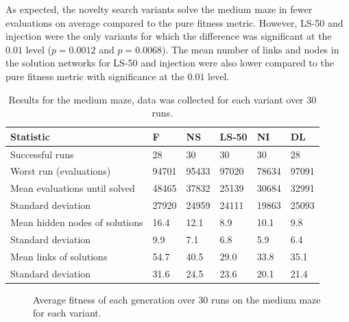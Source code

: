 As expected, the novelty search variants solve the medium maze in fewer evaluations on average
compared to the pure fitness metric. However, LS-50 and injection were the only variants for which
the difference was significant at the $0.01$ level ($p=0.0012$ and $p=0.0068$). The mean number of
links and nodes in the solution networks for LS-50 and injection were also lower
compared to the pure fitness metric with significance at the $0.01$ level.

\begin{table}[H]
    \centering
    \begin{tabular}{llllll}
    \toprule
    Statistic & \multicolumn{1}{l}{F} & \multicolumn{1}{l}{NS} & \multicolumn{1}{l}{LS-50} & \multicolumn{1}{l}{NI} & \multicolumn{1}{l}{DL} \\
    \midrule
    Successful runs & 28 & 30 & 30 & 30 & 28 \\
    Worst run (evaluations) & 94701 & 95433 & 97020 & 78634 & 97091 \\
    \rowcolor[gray]{.9} Mean evaluations until solved & 48465 & 37832 & 25139 & 30684 & 32991 \\
    Standard deviation & 27920  & 24959 & 24111 & 19863 & 25093 \\
    \rowcolor[gray]{.9} Mean hidden nodes of solutions & 16.4 & 12.1  & 8.9  & 10.1 & 9.8 \\
    Standard deviation & 9.9 & 7.1 & 6.8 & 5.9 & 6.4 \\
    \rowcolor[gray]{.9} Mean links of solutions & 54.7  & 40.5 & 29.0 & 33.8 & 35.1 \\
    Standard deviation & 31.6  & 24.5 & 23.6 & 20.1 & 21.4\\
    \bottomrule
    \end{tabular}
    \caption{Results for the medium maze, data was collected for each variant over 30 runs.}
    \label{medium}
\end{table}

\begin{figure}[H]
    \begin{center}
        
    \end{center}
    \caption{Average fitness of each generation over 30 runs on the medium maze for each variant.}
    \label{medium_fitness}
\end{figure}

